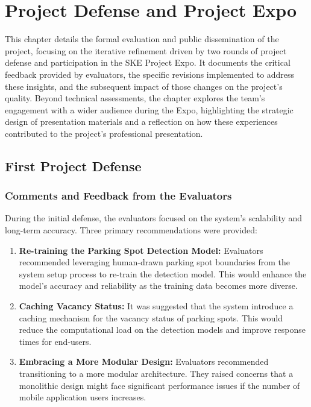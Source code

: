 \chapter{Project Defense and Project Expo}
\label{chap:project-defense-and-project-expo}

This chapter details the formal evaluation and public dissemination of the project, focusing on the iterative refinement driven by two rounds of project defense and participation in the SKE Project Expo. It documents the critical feedback provided by evaluators, the specific revisions implemented to address these insights, and the subsequent impact of those changes on the project's quality. Beyond technical assessments, the chapter explores the team's engagement with a wider audience during the Expo, highlighting the strategic design of presentation materials and a reflection on how these experiences contributed to the project's professional presentation.

\section{First Project Defense}
\label{section:first-project-defense}

\subsection{Comments and Feedback from the Evaluators}
\label{section:first-project-defense-comments-and-feedback-from-the-evaluators}

During the initial defense, the evaluators focused on the system's scalability and long-term accuracy. Three primary recommendations were provided:

\begin{enumerate}
    \item \textbf{Re-training the Parking Spot Detection Model:} Evaluators recommended leveraging human-drawn parking spot boundaries from the system setup process to re-train the detection model. This would enhance the model's accuracy and reliability as the training data becomes more diverse.
    \item \textbf{Caching Vacancy Status:} It was suggested that the system introduce a caching mechanism for the vacancy status of parking spots. This would reduce the computational load on the detection models and improve response times for end-users.
    \item \textbf{Embracing a More Modular Design:} Evaluators recommended transitioning to a more modular architecture. They raised concerns that a monolithic design might face significant performance issues if the number of mobile application users increases.
\end{enumerate}

